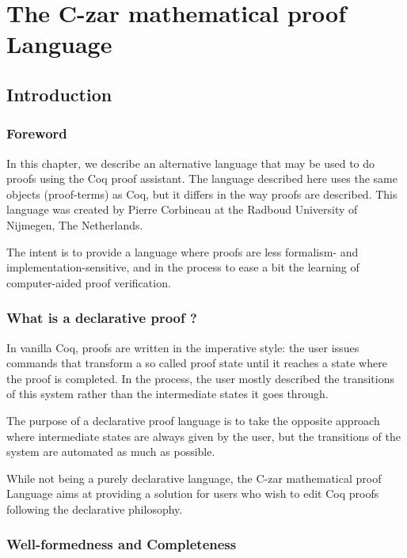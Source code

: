 \newcommand{\DPL}{C-zar mathematical proof Language}

\chapter{The \DPL\label{DPL}}

\section{Introduction}

\subsection{Foreword}

In this chapter, we describe an alternative language that may be used
to do proofs using the Coq proof assistant.  The language described
here uses the same objects (proof-terms) as Coq, but it differs in the
way proofs are described. This language was created by Pierre
Corbineau at the Radboud University of Nijmegen, The Netherlands.

The intent is to provide a language where proofs are less formalism-{}
and implementation-{}sensitive, and in the process to ease a bit the
learning of computer-{}aided proof verification.

\subsection{What is a declarative proof ?{}}
In vanilla Coq, proofs are written in the imperative style: the user
issues commands that transform a so called proof state until it
reaches a state where the proof is completed. In the process, the user
mostly described the transitions of this system rather than the
intermediate states it goes through.

The purpose of a declarative proof language is to take the opposite
approach where intermediate states are always given by the user, but
the transitions of the system are automated as much as possible.

While not being a purely declarative language, the \DPL{} aims at
providing a solution for users who wish to edit Coq proofs following
the declarative philosophy.

\subsection{Well-formedness and Completeness}

